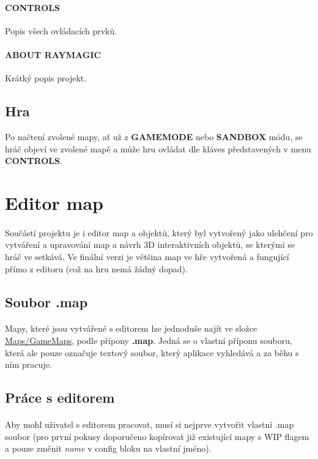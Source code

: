 \documentclass[a4paper, 12pt]{article}
\begin{document}
\paragraph{CONTROLS}
Popis všech ovládacích prvků.

\paragraph{ABOUT RAYMAGIC}
Krátký popis projekt.

\subsection{Hra}
Po načtení zvolené mapy, ať už z \textbf{GAMEMODE} nebo \textbf{SANDBOX} módu,
se hráč objeví ve zvolené mapě a může hru ovládat dle kláves představených v
menu \textbf{CONTROLS}.


\section{Editor map}
\paragraph{} 
Součástí projektu je i editor map a objektů, který byl vytvořený jako ulehčení
pro vytváření a upravování map a návrh 3D interaktivních objektů, se kterými se
hráč ve setkává. Ve finální verzi je většina map ve hře vytvořená a fungující
přímo z editoru (což na hru nemá žádný dopad).

\subsection{Soubor .map}
\paragraph{}
Mapy, které jsou vytvářené s editorem lze jednoduše najít ve složce
\url{Maps/GameMaps}, podle přípony \textbf{.map}. Jedná se o vlastní příponu
souboru, která ale pouze označuje textový soubor, který aplikace vyhledává a za
běhu s ním pracuje.

\subsection{Práce s editorem}
\paragraph{}
Aby mohl uživatel s editorem pracovat, musí si nejprve vytvořit vlastní .map
soubor (pro první pokusy doporučeno kopírovat již existující mapy s WIP flagem
a pouze změnit \emph{name} v config bloku na vlastní jméno). 
\end{document}
